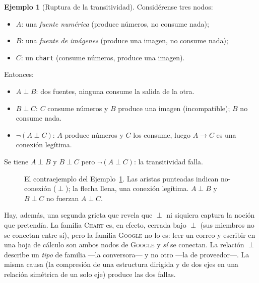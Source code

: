 \documentclass[11pt,a4paper]{article}
\theoremstyle{definition}
\newtheorem{ejemplo}{Ejemplo}[section]
\theoremstyle{plain}
\newcommand{\mundo}[1]{\textsc{#1}}   %
\begin{document}
\begin{ejemplo}[Ruptura de la transitividad]\label{ej:trans}
Considérense tres nodos:
\begin{itemize}[nosep,leftmargin=1.4em]
  \item $A$: una \emph{fuente numérica} (produce números, no consume nada);
  \item $B$: una \emph{fuente de imágenes} (produce una imagen, no consume nada);
  \item $C$: un \texttt{chart} (consume números, produce una imagen).
\end{itemize}
Entonces:
\begin{itemize}[nosep,leftmargin=1.4em]
  \item $A \perp B$: dos fuentes, ninguna consume la salida de la otra. \checkmark
  \item $B \perp C$: $C$ consume números y $B$ produce una imagen (incompatible);
        $B$ no consume nada. \checkmark
  \item $\lnot(A \perp C)$: $A$ produce números y $C$ los consume, luego
        $A \to C$ es una conexión legítima. 
\end{itemize}
Se tiene $A \perp B$ y $B \perp C$ pero $\lnot(A \perp C)$: la transitividad falla.
\end{ejemplo}

\begin{figure}[h]
\centering
{}
\caption{El contraejemplo del Ejemplo~\ref{ej:trans}. Las aristas punteadas indican
no-conexión ($\perp$); la flecha llena, una conexión legítima. $A\perp B$ y
$B\perp C$ no fuerzan $A\perp C$.}
\label{fig:trans}
\end{figure}

Hay, además, una segunda grieta que revela que $\perp$ ni siquiera captura la
noción que pretendía. La familia \mundo{Chart} es, en efecto, cerrada bajo $\perp$
(sus miembros no se conectan entre sí), pero la familia \mundo{Google} no lo es:
leer un correo y escribir en una hoja de cálculo son ambos nodos de \mundo{Google}
y \emph{sí} se conectan. La relación $\perp$ describe un \emph{tipo} de familia ---la
conversora--- y no otro ---la de proveedor---. La misma causa (la compresión de una
estructura dirigida y de dos ejes en una relación simétrica de un solo eje) produce
las dos fallas.
\end{document}

